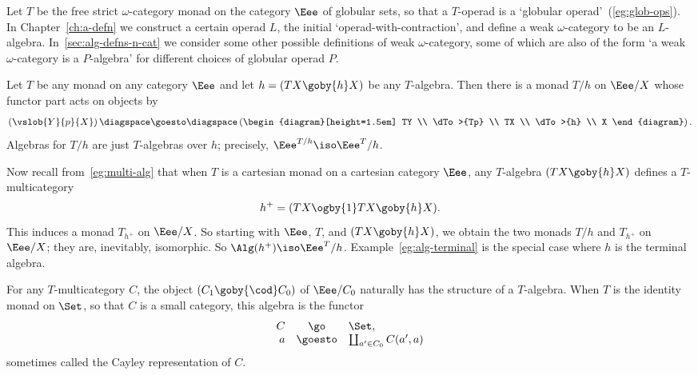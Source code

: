 \begin{example}
Let $T$ be the free strict $\omega$-category monad on the category $\Eee$
of globular sets, so that a $T$-operad is a `globular%
%
%
operad'~(\ref{eg:glob-ops}).  In Chapter~\ref{ch:a-defn} we construct a
certain operad $L$, the initial `operad-with-contraction', and define a
weak $\omega$-category to be an $L$-algebra.  In~\ref{sec:alg-defns-n-cat}
we consider some other possible definitions%
%
%
%
%
of weak $\omega$-category, some
of which are also of the form `a weak $\omega$-category is a $P$-algebra'
for different choices of globular operad $P$.
\end{example}


\begin{example}		%
%
%
%
%
%
Let $T$ be any monad on any category $\Eee$ and let $h= (TX \goby{h} X)$ be
any $T$-algebra.  Then there is a monad $T/h$%
% 
% 
on $\Eee/X$ whose functor
part acts on objects by
\[
\left(
\vslob{Y}{p}{X}
\right)
\diagspace 
\goesto 
\diagspace
\left(
\begin{diagram}[height=1.5em]
TY	\\ \dTo>{Tp}	\\ TX	\\ \dTo>{h}	\\ X
\end{diagram}
\right).
\]
Algebras for $T/h$ are just $T$-algebras over $h$; precisely, $\Eee^{T/h}
\iso \Eee^T/h$.

Now recall from~\ref{eg:multi-alg} that when $T$ is a cartesian monad on a
cartesian category $\Eee$, any $T$-algebra $(TX \goby{h} X)$ defines a
$T$-multicategory
\[
h^+ = (TX \ogby{1} TX \goby{h} X).
\]%
%
%
%
This induces a monad $T_{h^+}$ on $\Eee/X$.  So starting with $\Eee$, $T$,
and $(TX \goby{h} X)$, we obtain the two monads $T/h$ and $T_{h^+}$ on
$\Eee/X$; they are, inevitably, isomorphic.  So $\Alg(h^+) \iso \Eee^T /
h$.  Example~\ref{eg:alg-terminal} is the special case where $h$ is the
terminal algebra.
\end{example}

\begin{example}
For any $T$-multicategory $C$, the object $(C_1 \goby{\cod} C_0)$ of
$\Eee/C_0$ naturally has the structure of a $T$-algebra.  When
$T$ is the identity monad on $\Set$, so that $C$ is a small category, this
algebra is the functor
\[
\begin{array}{rcl}
C	&\go		&\Set,	\\
a	&\goesto	&\coprod_{a'\in C_0} C(a',a)	
\end{array}
\]
sometimes called the Cayley%
%
%
%
%
representation of $C$.  
\end{example}

